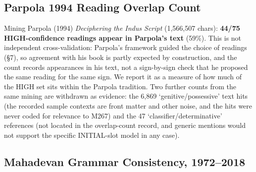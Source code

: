 \documentclass[11pt]{article}
\begin{document}
\subsection{Parpola 1994 Reading Overlap Count }\label{parpola-1994-reading-cross-validation-phase-159}

Mining Parpola (1994) \emph{Deciphering the Indus Script} (1,566,507
chars): \textbf{44/75 HIGH-confidence readings appear in Parpola's text} (59\%). This is not independent cross-validation: Parpola's framework guided the choice of readings (§7), so agreement with his book is partly expected by construction, and the count records appearances in his text, not a sign-by-sign check that he proposed the same reading for the same sign. We report it as a measure of how much of the HIGH set sits within the Parpola tradition. Two further counts from the same mining are withdrawn as evidence: the 6,869 `genitive/possessive' text hits (the recorded sample contexts are front matter and other noise, and the hits were never coded for relevance to M267) and the 47 `classifier/determinative' references (not located in the overlap-count record, and generic mentions would not support the specific INITIAL-slot model in any case).

\subsection{Mahadevan Grammar Consistency, 1972--2018
}\label{mahadevan-four-decade-grammar-consistency-phase-160}
\end{document}
